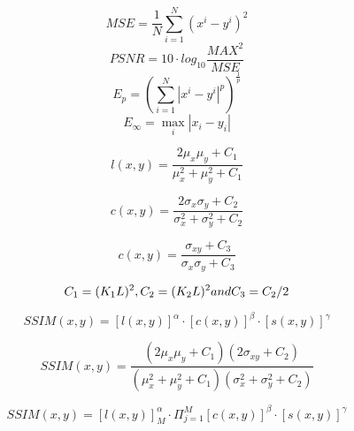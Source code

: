 \begin{equation}
MSE= \frac{1}{N} \sum_{i=1}^N{(x^i-y^i)^2}
\end{equation}
\begin{equation}
PSNR= 10 \cdot log_{10}\frac{MAX^2}{MSE}
\end{equation}
\begin{equation}
E_p = ( \sum_{i=1}^N{|x^i-y^i|^p})^{\frac{1}{p}}
\end{equation}
\begin{equation}
E_\infty = \max_i{|x_i-y_i|}
\end{equation}

\begin{equation}
l(x, y) = \frac{2\mu_x \mu_y + C_1}{\mu_x^2 + \mu_y^2 + C_1}
\end{equation}

\begin{equation}
c(x, y) = \frac{2\sigma_x \sigma_y + C_2}{\sigma_x^2 + \sigma_y^2 + C_2}
\end{equation}

\begin{equation}
c(x, y) = \frac{\sigma_{xy} + C_3}{\sigma_x \sigma_y + C_3}
\end{equation}

\begin{equation}
C_1 = (K_1 L)^2, C_2 = (K_2 L)^2 \space and \space C_3 = C_2/2
\end{equation}

\begin{equation}
SSIM(x, y) = [l(x, y)]^\alpha \cdot[c(x, y)]^\beta \cdot[s(x, y)]^\gamma
\end{equation} 

\begin{equation}
SSIM(x, y) = \frac{(2\mu_x \mu_y + C_1)(2\sigma_{xy} + C_2)}{(\mu_x^2 + \mu_y^2 + C_1)(\sigma_x^2 + \sigma_y^2 + C_2)}
\end{equation} 

\begin{equation}
SSIM(x, y) = [l(x, y)]^\alpha_M \cdot\Pi_{j=1}^M{[c(x, y)]^\beta \cdot[s(x, y)]^\gamma}
\end{equation} 